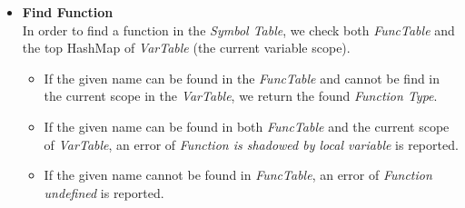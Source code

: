 \documentclass[a4paper,11pt]{article}
\begin{document}
\begin{itemize}
	\item \textbf{Find Function} \\
	In order to find a function in the \emph{Symbol Table}, we check both \emph{FuncTable} and the top HashMap of \emph{VarTable} (the current variable scope). 
	\begin{itemize}
		\item If the given name can be found in the \emph{FuncTable} and cannot be find in the current scope in the \emph{VarTable}, we return the found \emph{Function Type}.
		\item If the given name can be found in both \emph{FuncTable} and the current scope of \emph{VarTable}, an error of \textit{Function is shadowed by local variable} is reported.
		\item If the given name cannot be found in \emph{FuncTable}, an error of \textit{Function undefined} is reported.
	\end{itemize}
	
	
\end{itemize}
\end{document}
